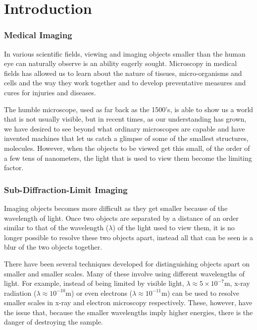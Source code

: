 \part{Introduction}

\section{Medical Imaging}
\label{sec:section_name}

In various scientific fields, viewing and imaging objects smaller than the human
eye can naturally observe is an ability eagerly sought. Microscopy in medical
fields has allowed us to learn about the nature of tissues, micro-organisms and
cells and the way they work together and to develop preventative measures and
cures for injuries and diseases.

The humble microscope, used as far back as the 1500's, is able to show us a
world that is not usually visible, but in recent times, as our understanding
has grown, we have desired to see beyond what ordinary microscopes are capable
and have invented machines that let us catch a glimpse of some of the smallest
structures, molecules. However, when the objects to be viewed get this small, of
the order of a few tens of nanometers, the light that is used to view them
become the limiting factor.

\section{Sub-Diffraction-Limit Imaging}
\label{sec:sub_diffraction_limit_imaging}

Imaging objects becomes more difficult as they get smaller because of the
wavelength of light. Once two objects are separated by a distance of an order
similar to that of the wavelength ($\lambda$) of the light used to view them,
it is no longer possible to resolve these two objects apart, instead all that
can be seen is a blur of the two objects together.

There have been several techniques developed for distinguishing objects apart
on smaller and smaller scales. Many of these involve using different
wavelengths of light.  For example, instead of being limited by visible light,
$\lambda \approx 5\times 10^{-7} \textrm{m}$, x-ray radiation ($\lambda \approx
10^{-10} \textrm{m}$) or even electrons ($\lambda \approx 10^{-11} \textrm{m}$)
can be used to resolve smaller scales in x-ray and electron microscopy
respectively. These, however, have the issue that, because the smaller
wavelengths imply higher energies, there is the danger of destroying the sample.

